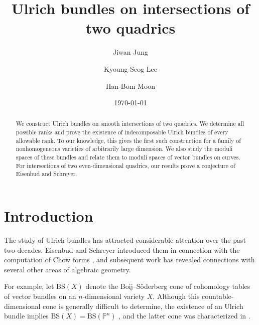 \documentclass[12pt, letterpaper]{amsart}
\theoremstyle{definition}
\newcommand{\PP}{\mathbb{P} }
\begin{document}
\title{Ulrich bundles on intersections of two quadrics} \date{\today}


\author{Jiwan Jung} \address{Jiwan Jung, Department of Mathematics, POSTECH, 77, Cheongam-ro, Nam-gu, Pohang-si, Gyeongsangbuk-do, 37673, Korea} 

\author{Kyoung-Seog Lee} \address{Kyoung-Seog Lee, Department of Mathematics, POSTECH, 77, Cheongam-ro, Nam-gu, Pohang-si, Gyeongsangbuk-do, 37673, Korea} 

\author{Han-Bom Moon} \address{Han-Bom Moon, Department of Mathematics, Fordham University, New York, NY 10023} 

\begin{abstract}
We construct Ulrich bundles on smooth intersections of two quadrics. We determine all possible ranks and prove the existence of indecomposable Ulrich bundles of every allowable rank. To our knowledge, this gives the first such construction for a family of nonhomogeneous varieties of arbitrarily large dimension. We also study the moduli spaces of these bundles and relate them to moduli spaces of vector bundles on curves. For intersections of two even-dimensional quadrics, our results prove a conjecture of Eisenbud and Schreyer.
\end{abstract}

\maketitle

\section{Introduction}\label{sec:intro}

The study of Ulrich bundles has attracted considerable attention over the past two decades. Eisenbud and Schreyer introduced them in connection with the computation of Chow forms \cite{ES03}, and subsequent work has revealed connections with several other areas of algebraic geometry.

For example, let \(\mathrm{BS}(X)\) denote the Boij--S\"oderberg cone of cohomology tables of vector bundles on an \(n\)-dimensional variety \(X\). Although this countable-dimensional cone is generally difficult to determine, the existence of an Ulrich bundle implies \(\mathrm{BS}(X) = \mathrm{BS}(\PP^n)\) \cite{ES11}, and the latter cone was characterized in \cite{ES09}.
\end{document}
